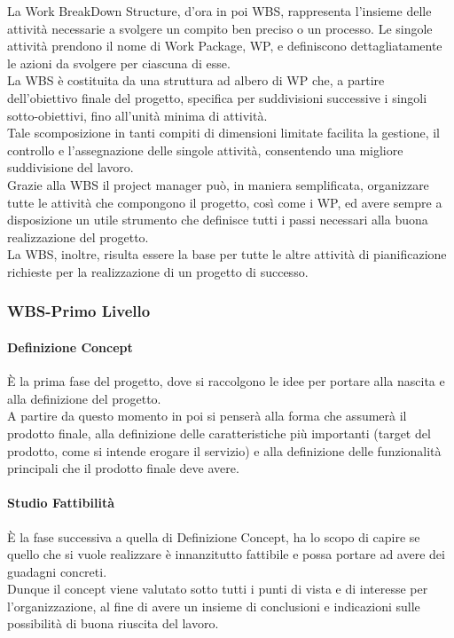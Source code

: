 La Work BreakDown Structure, d'ora in poi WBS, rappresenta l'insieme delle attività necessarie a svolgere un compito ben preciso o un processo. Le singole attività prendono il nome di Work Package, WP, e definiscono dettagliatamente le azioni da svolgere per
ciascuna di esse.\\
La WBS è costituita da una struttura ad albero di WP che, a partire dell'obiettivo finale del progetto, specifica per suddivisioni successive i singoli sotto-obiettivi, fino all'unità minima di attività.\\
Tale scomposizione in tanti compiti di dimensioni limitate facilita la gestione, il controllo e l'assegnazione delle singole attività, consentendo una migliore suddivisione del lavoro.\\
Grazie alla WBS il project manager può, in maniera semplificata, organizzare tutte le attività che compongono il progetto, così come i WP, ed avere sempre a disposizione un utile strumento che definisce tutti i passi necessari alla buona realizzazione del progetto.\\
La WBS, inoltre, risulta essere la base per tutte le altre attività di pianificazione richieste per la realizzazione di un progetto di successo.

\subsubsection{WBS-Primo Livello}
\paragraph{Definizione Concept}
È la prima fase del progetto, dove si raccolgono le idee per portare alla nascita e alla definizione del progetto.\\
A partire da questo momento in poi si penserà alla forma che assumerà il prodotto finale, alla  definizione delle caratteristiche più importanti (target del prodotto, come si intende erogare il servizio) e alla definizione delle funzionalità principali che il prodotto finale deve avere.

\paragraph{Studio Fattibilità}
È la fase successiva a quella di Definizione Concept, ha lo scopo di capire se quello che si vuole realizzare è innanzitutto fattibile e possa portare ad avere dei guadagni concreti.\\
Dunque il concept viene valutato sotto tutti i punti di vista e di interesse per l'organizzazione, al fine di avere un insieme di conclusioni e indicazioni sulle possibilità di buona riuscita del lavoro.


